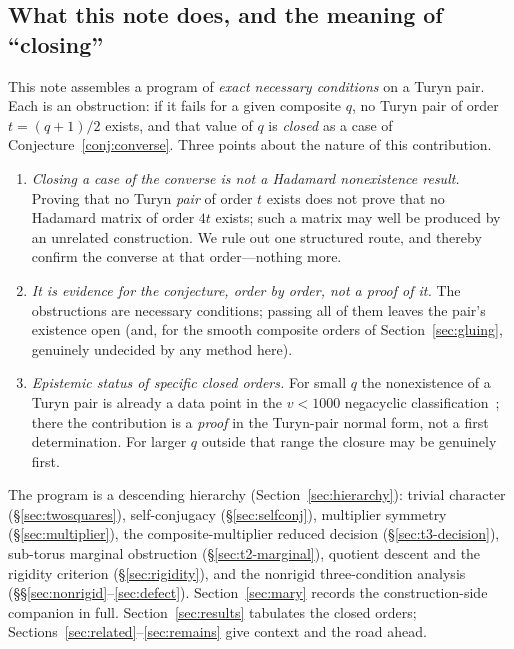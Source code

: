 \documentclass[11pt]{article}
\theoremstyle{plain}
\theoremstyle{definition}
\theoremstyle{remark}
\begin{document}
\subsection{What this note does, and the meaning of ``closing''}
\label{sec:contribution}

This note assembles a program of \emph{exact necessary conditions} on a Turyn
pair. Each is an obstruction: if it fails for a given composite $q$, no Turyn
pair of order $t=(q+1)/2$ exists, and that value of $q$ is \emph{closed} as a
case of Conjecture~\ref{conj:converse}. Three points about the nature of this
contribution.

\begin{enumerate}
\item \emph{Closing a case of the converse is not a Hadamard nonexistence
  result.} Proving that no Turyn \emph{pair} of order $t$ exists does not prove
  that no Hadamard matrix of order $4t$ exists; such a matrix may well be
  produced by an unrelated construction. We rule out one structured route, and
  thereby confirm the converse at that order---nothing more.
\item \emph{It is evidence for the conjecture, order by order, not a proof of
  it.} The obstructions are necessary conditions; passing all of them leaves the
  pair's existence open (and, for the smooth composite orders of
  Section~\ref{sec:gluing}, genuinely undecided by any method here).
\item \emph{Epistemic status of specific closed orders.} For small $q$ the
  nonexistence of a Turyn pair is already a data point in the $v<1000$
  negacyclic classification~\cite{DGS71,Seberry16}; there the contribution is a
  \emph{proof} in the Turyn-pair normal form, not a first determination. For
  larger $q$ outside that range the closure may be genuinely first.
\end{enumerate}

The program is a descending hierarchy (Section~\ref{sec:hierarchy}): trivial
character (\S\ref{sec:twosquares}), self-conjugacy (\S\ref{sec:selfconj}),
multiplier symmetry (\S\ref{sec:multiplier}), the composite-multiplier reduced
decision (\S\ref{sec:t3-decision}), sub-torus marginal obstruction
(\S\ref{sec:t2-marginal}), quotient descent and the rigidity criterion
(\S\ref{sec:rigidity}), and the nonrigid three-condition analysis
(\S\S\ref{sec:nonrigid}--\ref{sec:defect}). Section~\ref{sec:mary} records the
construction-side companion in full. Section~\ref{sec:results} tabulates the
closed orders; Sections~\ref{sec:related}--\ref{sec:remains} give context and
the road ahead.
\end{document}
